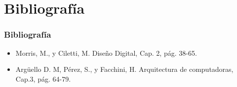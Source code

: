 \documentclass[11pt]{beamer}
\begin{document}
\section{Bibliograf\'ia}
\begin{frame}
	\frametitle{Bibliograf\'ia}
	\begin{itemize}
		\item Morris, M., y Ciletti, M. Diseño Digital, Cap. 2, pág. 38-65.
		\item Argüello D. M, Pérez, S., y Facchini, H. Arquitectura de computadoras, Cap.3, pág. 64-79.
		\end{itemize}
\end{frame}
\end{document}
